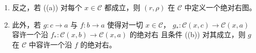 \begin{proposition}
\begin{enumerate}[label=(\roman*)]
\begin{enumerate}[label=(\alph*)]
\begin{center}
\end{center}
  \end{enumerate}
\item 反之，若 ((a)) 对每个 $x\in\mathcal{C}$ 都成立，则 $(r,\rho)$ 在
  $\mathcal{C}$ 中定义一个绝对右\trLifting{}图。
\item 此外，若 $g\colon c\to a$ 与 $f\colon b\to a$ 使得对一切
  $x\in\mathcal{C}$，\trFunctor{} $g_{\ast}\colon\mathcal{C}(x,c)\to\mathcal{C}(x,a)$
  容许一个沿 $f_{\ast}\colon\mathcal{C}(x,b)\to\mathcal{C}(x,a)$ 的绝对右%
  \trLifting{}且条件 ((b)) 对其成立，则 $g$ 在 $\mathcal{C}$ 中容许一个沿 $f$
  的绝对右\trLifting。
\end{enumerate}
\end{proposition}

